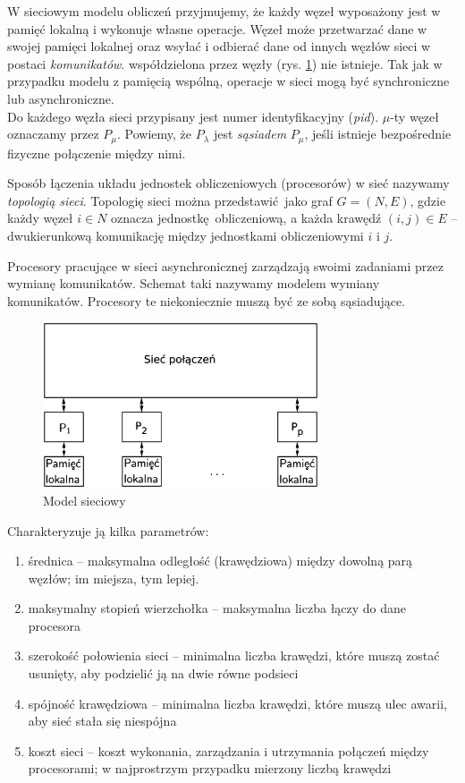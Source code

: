 W sieciowym modelu obliczeń przyjmujemy, że każdy węzeł wyposażony jest w pamięć lokalną i wykonuje własne operacje. Węzeł może przetwarzać dane w swojej pamięci lokalnej oraz wsyłać i odbierać dane od innych węzłów sieci w postaci \emph{komunikatów}.  współdzielona przez węzły (rys. \ref{fig:model_net}) nie istnieje. Tak jak w przypadku modelu z pamięcią wspólną, operacje w sieci mogą być synchroniczne lub asynchroniczne.\\

Do każdego węzła sieci przypisany jest numer identyfikacyjny (\emph{pid}). \(\mu\)-ty węzeł oznaczamy przez \(P_\mu\). Powiemy, że \(P_\lambda\) jest \emph{sąsiadem} \(P_\mu\), jeśli istnieje bezpośrednie fizyczne połączenie między nimi.\cite{Golub}

Sposób łączenia układu jednostek obliczeniowych (procesorów) w sieć nazywamy \emph{topologią sieci}. Topologię sieci można przedstawić jako graf \(G=(N,E)\), gdzie każdy węzeł \(i\in N\) oznacza jednostkę obliczeniową, a każda krawędź \((i, j) \in E\) – dwukierunkową komunikację między jednostkami obliczeniowymi \(i\) i \(j\). 

Procesory pracujące w sieci asynchronicznej zarządzają swoimi zadaniami przez wymianę komunikatów. Schemat taki nazywamy modelem wymiany komunikatów. Procesory te niekoniecznie muszą być ze sobą sąsiadujące. 

\begin{figure}[h]
\centering
\includegraphics[width=22em]{images/Rys_net.eps}
\caption{Model sieciowy}
\label{fig:model_net}
\end{figure}

Charakteryzuje ją kilka parametrów:

\begin{enumerate}
 \item średnica – maksymalna odległość (krawędziowa) między dowolną parą węzłów; im miejsza, tym lepiej.
 \item maksymalny stopień wierzchołka – maksymalna liczba łączy do dane procesora
 \item szerokość połowienia sieci – minimalna liczba krawędzi, które muszą zostać usunięty, aby podzielić ją na dwie równe podsieci
 \item spójność krawędziowa – minimalna liczba krawędzi, które muszą ulec awarii, aby sieć stała się niespójna
 \item koszt sieci – koszt wykonania, zarządzania i utrzymania połączeń między procesorami; w najprostrzym przypadku mierzony liczbą krawędzi
\end{enumerate}


